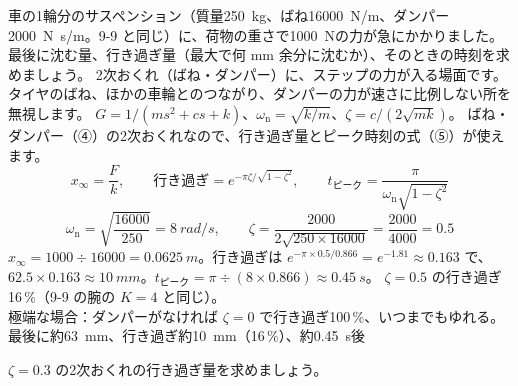 \label{ph:波-4:ex3}
\begin{phreidai}[荷物を積んだ車の沈み方]
車の1輪分のサスペンション（質量\qty{250}{kg}、ばね\qty{16000}{N/m}、ダンパー\qty{2000}{N.s/m}。9-9 と同じ）に、荷物の重さで\qty{1000}{N}の力が急にかかりました。最後に沈む量、行き過ぎ量（最大で何 mm 余分に沈むか）、そのときの時刻を求めましょう。
\phbamen
2次おくれ（ばね・ダンパー）に、ステップの力が入る場面です。
\phmushi
タイヤのばね、ほかの車輪とのつながり、ダンパーの力が速さに比例しない所を無視します。
\phzu
$G=1/(ms^2+cs+k)$、$\omega_{\mathrm n}=\sqrt{k/m}$、$\zeta=c/(2\sqrt{mk})$。
\phriyu
ばね・ダンパー（④）の2次おくれなので、行き過ぎ量とピーク時刻の式（⑤）が使えます。
\phtateru
\[x_{\infty}=\frac{F}{k},\qquad\text{行き過ぎ}=e^{-\pi\zeta/\sqrt{1-\zeta^2}},\qquad t_{\text{ピーク}}=\frac{\pi}{\omega_{\mathrm n}\sqrt{1-\zeta^2}}\]
\phtoku
\[\omega_{\mathrm n}=\sqrt{\frac{16000}{250}}=\qty{8}{rad/s},\qquad\zeta=\frac{2000}{2\sqrt{250\times16000}}=\frac{2000}{4000}=0.5\]
$x_{\infty}=1000\div16000=\qty{0.0625}{m}$。行き過ぎは $e^{-\pi\times0.5/0.866}=e^{-1.81}\approx0.163$ で、$62.5\times0.163\approx\qty{10}{mm}$。$t_{\text{ピーク}}=\pi\div(8\times0.866)\approx\qty{0.45}{s}$。
\phtashikame
$\zeta=0.5$ の行き過ぎ16\,\%（9-9 の腕の $K=4$ と同じ）。\\
極端な場合：ダンパーがなければ $\zeta=0$ で行き過ぎ100\,\%、いつまでもゆれる。
\kotae 最後に約\qty{63}{mm}、行き過ぎ約\qty{10}{mm}（16\,\%）、約\qty{0.45}{s}後
\end{phreidai}
\begin{jibun}
$\zeta=0.3$ の2次おくれの行き過ぎ量を求めましょう。
\end{jibun}

